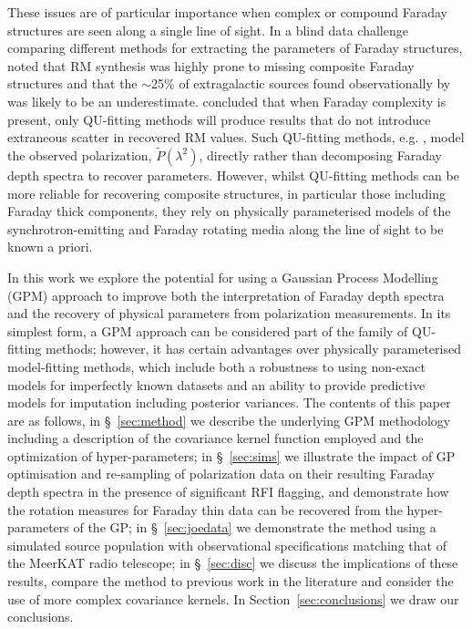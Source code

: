 \documentclass[fleqn,usenatbib]{mnras}
\begin{document}
These issues are of particular importance when complex or compound Faraday structures are seen along a single line of sight. In a blind data challenge comparing different methods for extracting the parameters of Faraday structures, \cite{Sun_2015} noted that RM synthesis was highly prone to missing composite Faraday structures and that the $\sim$25\% of extragalactic sources found observationally by \citep{law2011} was likely to be an underestimate. \cite{Sun_2015} concluded that when Faraday complexity is present, only QU-fitting methods will produce results that do not introduce extraneous scatter in recovered RM values. Such QU-fitting methods, e.g. \cite{Farnsworth_2011, 10.1111/j.1365-2966.2012.20554.x, 2014ApJ...792...51I}, model the observed polarization, $\tilde{P}(\lambda^2)$, directly rather than decomposing Faraday depth spectra to recover parameters. However, whilst QU-fitting methods can be more reliable for recovering composite structures, in particular those including Faraday thick components, they rely on physically parameterised models of the synchrotron-emitting and Faraday rotating media along the line of sight to be known a priori.

In this work we explore the potential for using a Gaussian Process Modelling (GPM) approach to improve both the interpretation of Faraday depth spectra and the recovery of physical parameters from polarization measurements. In its simplest form, a GPM approach can be considered part of the family of QU-fitting methods; however, it has certain advantages over physically parameterised model-fitting methods, which include both a robustness to using non-exact models for imperfectly known datasets and an ability to provide predictive models for imputation including posterior variances.  The contents of this paper are as follows, in \S~\ref{sec:method} we describe the underlying GPM methodology including a description of the covariance kernel function employed and the optimization of hyper-parameters; in \S~\ref{sec:sims} we illustrate the impact of GP optimisation and re-sampling of polarization data on their resulting Faraday depth spectra in the presence of significant RFI flagging, and demonstrate how the rotation measures for Faraday thin data can be recovered from the hyper-parameters of the GP; in \S~\ref{sec:joedata} we demonstrate the method using a simulated source population with observational specifications matching that of the MeerKAT radio telescope; in \S~\ref{sec:disc} we discuss the implications of these results, compare the method to previous work in the literature and consider the use of more complex covariance kernels. In Section~\ref{sec:conclusions} we draw our conclusions.
\end{document}
